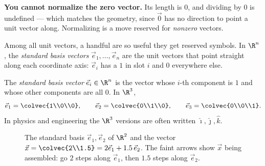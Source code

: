 \begin{trapbox}
\textbf{You cannot normalize the zero vector.} Its length is $0$, and dividing by $0$ is
undefined --- which matches the geometry, since $\vec{0}$ has no direction to point a unit
vector along. Normalizing is a move reserved for \emph{nonzero} vectors.
\end{trapbox}

Among all unit vectors, a handful are so useful they get reserved symbols. In $\R^n$, the
\emph{standard basis vectors} $\vec{e}_1,\dots,\vec{e}_n$ are the unit vectors that point
straight along each coordinate axis: $\vec{e}_i$ has a $1$ in slot $i$ and $0$ everywhere
else.

\begin{formalbox}
\begin{definition}
\label{ch02:def-ei}
The \emph{standard basis vector} $\vec{e}_i \in \R^n$ is the vector whose $i$-th component
is $1$ and whose other components are all $0$. In $\R^3$,
\[
  \vec{e}_1 = \colvec{1\\0\\0},\qquad
  \vec{e}_2 = \colvec{0\\1\\0},\qquad
  \vec{e}_3 = \colvec{0\\0\\1}.
\]
In physics and engineering the $\R^3$ versions are often written
$\hat{\imath},\hat{\jmath},\hat{k}$.
\end{definition}
\end{formalbox}

\begin{figure}[H]
\centering
{}
\caption{The standard basis $\vec{e}_1,\vec{e}_2$ of $\R^2$ and the vector
$\vec{x}=\colvec{2\\1.5}=2\vec{e}_1+1.5\,\vec{e}_2$. The faint arrows show $\vec{x}$ being
assembled: go $2$ steps along $\vec{e}_1$, then $1.5$ steps along $\vec{e}_2$.}
\label{ch02:fig-basis}
\end{figure}

